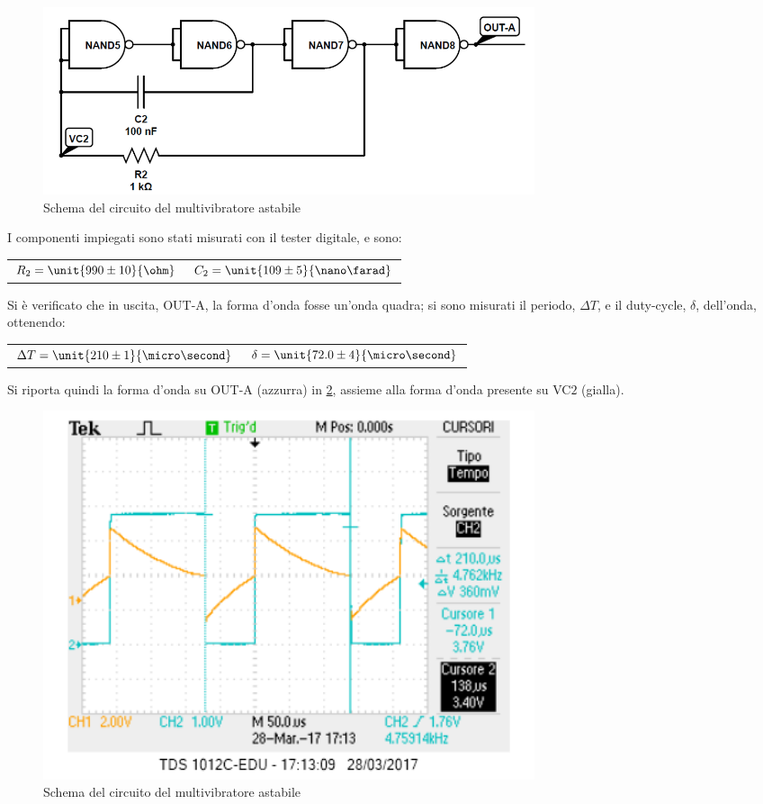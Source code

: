 \documentclass[a4paper,10pt]{article}
\begin{document}
\begin{figure}[H]
	\centering
	\includegraphics[width=0.7\textwidth]{../grafici/Astabile.png}
	\caption{Schema del circuito del multivibratore astabile}
	\label{fig:AST}
\end{figure}

I componenti impiegati sono stati misurati con il tester digitale, e sono:

\begin{table}[H]
	\centering
	\begin{tabular}{cc}
		$R_2 = \unit{990 \pm 10}{\ohm}$ & $C_2 = \unit{109 \pm 5}{\nano\farad}$\\
	\end{tabular}
\end{table}

Si è verificato che in uscita, OUT-A, la forma d'onda fosse un'onda quadra; si sono misurati il periodo, $\Delta T$, e il duty-cycle, $\delta$, dell'onda, ottenendo:

\begin{table}[H]
	\centering
	\begin{tabular}{cc}
		$\Delta T = \unit{210 \pm 1}{\micro\second}$ & $\delta = \unit{72.0 \pm 4}{\micro\second}$\\
	\end{tabular}
\end{table}

Si riporta quindi la forma d'onda su OUT-A (azzurra) in \cref{fig:ASTosc}, assieme alla forma d'onda presente su VC$2$ (gialla).

\begin{figure}[H]
	\centering
	\includegraphics[width=0.7\textwidth]{../grafici/astabileOSC.png}
	\caption{Schema del circuito del multivibratore astabile}
	\label{fig:ASTosc}
\end{figure}
\end{document}
